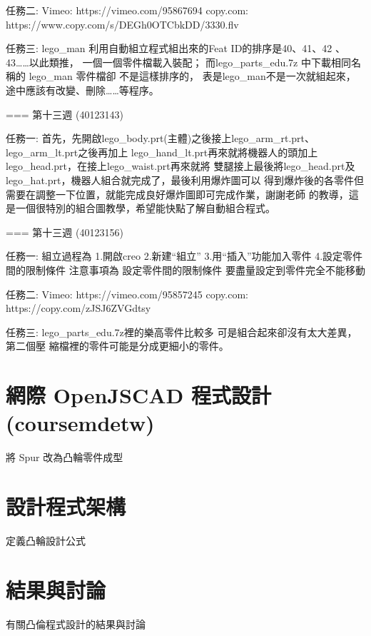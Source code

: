 \documentclass[]{article}
\begin{document}
任務二: Vimeo: https://vimeo.com/95867694 copy.com:
https://www.copy.com/s/DEGh0OTCbkDD/3330.flv

任務三: lego\_man 利用自動組立程式組出來的Feat ID的排序是40、41、42
、43\ldots{}\ldots{}以此類推， 一個一個零件檔載入裝配；
而lego\_parts\_edu.7z 中下載相同名稱的 lego\_man 零件檔卻
不是這樣排序的，
表是lego\_man不是一次就組起來，途中應該有改變、刪除\ldots{}\ldots{}等程序。

=== 第十三週 (40123143)

任務一:
首先，先開啟lego\_body.prt(主體)之後接上lego\_arm\_rt.prt、lego\_arm\_lt.prt之後再加上
lego\_hand\_lt.prt再來就將機器人的頭加上lego\_head.prt，在接上lego\_waist.prt再來就將
雙腿接上最後將lego\_head.prt及lego\_hat.prt，機器人組合就完成了，最後利用爆炸圖可以
得到爆炸後的各零件但需要在調整一下位置，就能完成良好爆炸圖即可完成作業，謝謝老師
的教導，這是一個很特別的組合圖教學，希望能快點了解自動組合程式。

=== 第十三週 (40123156)

任務一: 組立過程為 1.開啟creo 2.新建``組立'' 3.用``插入''功能加入零件
4.設定零件間的限制條件 注意事項為 設定零件間的限制條件
要盡量設定到零件完全不能移動

任務二: Vimeo: https://vimeo.com/95857245 copy.com:
https://copy.com/zJSJ6ZVGdtsy

任務三: lego\_parts\_edu.7z裡的樂高零件比較多
可是組合起來卻沒有太大差異，第二個壓
縮檔裡的零件可能是分成更細小的零件。

\section{網際 OpenJSCAD
程式設計(coursemdetw)}\label{ux7db2ux969b-openjscad-ux7a0bux5f0fux8a2dux8a08coursemdetw}

將 Spur 改為凸輪零件成型

\section{設計程式架構}\label{ux8a2dux8a08ux7a0bux5f0fux67b6ux69cb}

定義凸輪設計公式

\section{結果與討論}\label{ux7d50ux679cux8207ux8a0eux8ad6-6}

有關凸倫程式設計的結果與討論
\end{document}
